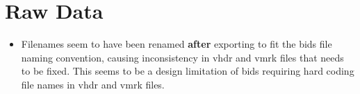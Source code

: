 \section{Raw Data}

\begin{itemize}
	\item Filenames seem to have been renamed \textbf{after} exporting to fit the bids file naming convention, causing inconsistency in vhdr and vmrk files that needs to be fixed. This seems to be a design limitation of bids requiring hard coding file names in vhdr and vmrk files. 
\end{itemize}
